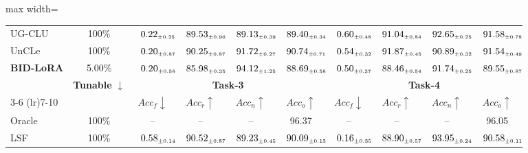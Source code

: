 \begin{table}[!htbp]
\begin{adjustbox}{max width=\textwidth}
\begin{tabular}{l|c|cccc|cccc}
UG-CLU & 100\% & $\kern6pt0.22_{\scriptscriptstyle \pm 0.25}\kern-6pt$ & $\kern6pt89.53_{\scriptscriptstyle \pm 0.96}\kern-6pt$ & $\kern6pt89.13_{\scriptscriptstyle \pm 0.39}\kern-6pt$ & $\kern6pt89.40_{\scriptscriptstyle \pm 0.34}\kern-6pt$ & $\kern6pt0.60_{\scriptscriptstyle \pm 0.48}\kern-6pt$ & $\kern6pt91.04_{\scriptscriptstyle \pm 0.84}\kern-6pt$ & \colorbox{yellow!35}{$\kern6pt92.65_{\scriptscriptstyle \pm 0.25}\kern-6pt$} & \colorbox{green!25}{$\kern6pt91.58_{\scriptscriptstyle \pm 0.78}\kern-6pt$} \\
UnCLe & 100\% & $\kern6pt0.20_{\scriptscriptstyle \pm 0.87}\kern-6pt$ & \colorbox{yellow!35}{$\kern6pt90.25_{\scriptscriptstyle \pm 0.87}\kern-6pt$} & $\kern6pt91.72_{\scriptscriptstyle \pm 0.27}\kern-6pt$ & \colorbox{yellow!35}{$\kern6pt90.74_{\scriptscriptstyle \pm 0.71}\kern-6pt$} & $\kern6pt0.54_{\scriptscriptstyle \pm 0.32}\kern-6pt$ & \colorbox{green!25}{$\kern6pt91.87_{\scriptscriptstyle \pm 0.45}\kern-6pt$} & $\kern6pt90.89_{\scriptscriptstyle \pm 0.32}\kern-6pt$ & \colorbox{yellow!35}{$\kern6pt91.54_{\scriptscriptstyle \pm 0.49}\kern-6pt$} \\
\midrule
\rowcolor{pink!15}
\textbf{BID-LoRA} & 5.00\% & $\kern6pt0.20_{\scriptscriptstyle \pm 0.58}\kern-6pt$ & $\kern6pt85.98_{\scriptscriptstyle \pm 0.35}\kern-6pt$ & \colorbox{green!25}{$\kern6pt94.12_{\scriptscriptstyle \pm 1.25}\kern-6pt$} & $\kern6pt88.69_{\scriptscriptstyle \pm 0.58}\kern-6pt$ & $\kern6pt0.50_{\scriptscriptstyle \pm 0.37}\kern-6pt$ & $\kern6pt88.46_{\scriptscriptstyle \pm 0.54}\kern-6pt$ & $\kern6pt91.74_{\scriptscriptstyle \pm 0.25}\kern-6pt$ & $\kern6pt89.55_{\scriptscriptstyle \pm 0.87}\kern-6pt$ \\
\midrule
\addlinespace[0.05cm]
\midrule
\multirow{2}{*}{\textbf{Method}} & \multirow{2}{*}{\textbf{Tunable} $\downarrow$}
& \multicolumn{4}{c|}{\textbf{Task-3}} & \multicolumn{4}{c}{\textbf{Task-4}} \\
\cmidrule(lr){3-6} \cmidrule(lr){7-10}
& & $Acc_f \downarrow$ & $Acc_r \uparrow$ & $Acc_n \uparrow$ & $Acc_o \uparrow$
& $Acc_f \downarrow$ & $Acc_r \uparrow$ & $Acc_n \uparrow$ & $Acc_o \uparrow$ \\
\midrule
Oracle        & 100\% & -- & -- & -- & 96.37 & -- & -- & -- & 96.05 \\
\midrule
LSF & 100\% & $\kern6pt0.58_{\scriptscriptstyle \pm 0.14}\kern-6pt$ & \colorbox{green!25}{$\kern6pt90.52_{\scriptscriptstyle \pm 0.87}\kern-6pt$} & $\kern6pt89.23_{\scriptscriptstyle \pm 0.45}\kern-6pt$ & \colorbox{yellow!35}{$\kern6pt90.09_{\scriptscriptstyle \pm 0.13}\kern-6pt$} & $\kern6pt0.16_{\scriptscriptstyle \pm 0.35}\kern-6pt$ & $\kern6pt88.90_{\scriptscriptstyle \pm 0.57}\kern-6pt$ & \colorbox{green!25}{$\kern6pt93.95_{\scriptscriptstyle \pm 0.24}\kern-6pt$} & $\kern6pt90.58_{\scriptscriptstyle \pm 0.11}\kern-6pt$ \\

\end{tabular}
\end{adjustbox}
\end{table}
